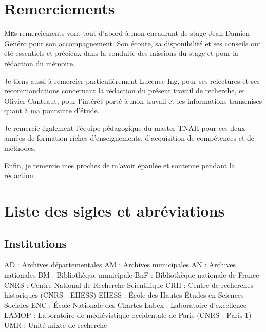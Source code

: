 \documentclass[a4paper,12pt,twoside]{book}
\begin{document}
		\newpage{\pagestyle{empty}\cleardoublepage}
	
	\chapter{Remerciements}
	
	\lettrine{M}es remerciements vont tout d'abord à mon encadrant de stage Jean-Damien Généro pour son accompagnement. Son écoute, sa disponibilité et ses conseils ont été essentiels et précieux dans la conduite des missions du stage et pour la rédaction du mémoire. 
    \newline 
    \par Je tiens aussi à remercier particulièrement Lucence Ing, pour ses relectures et ses recommandations concernant la rédaction du présent travail de recherche, et Olivier Canteaut, pour l'intérêt porté à mon travail et les informations transmises quant à ma poursuite d'étude.
    \newline 
    \par Je remercie également l'équipe pédagogique du master TNAH pour ces deux années de formation riches d'enseignements, d'acquisition de compétences et de méthodes. 
    \newline 
    \par Enfin, je remercie mes proches de m'avoir épaulée et soutenue pendant la rédaction. 

    \newpage{\pagestyle{empty}\cleardoublepage}
	
	\chapter{Liste des sigles et abréviations}

    \section*{Institutions}

    \noindent AD : Archives départementales
    \newline 
    AM : Archives municipales
    \newline 
    AN : Archives nationales
    \newline 
    BM : Bibliothèque municipale
    \newline 
    BnF : Bibliothèque nationale de France
    \newline 
    CNRS : Centre National de Recherche Scientifique
    \newline 
    CRH : Centre de recherches historiques (CNRS - EHESS)
    \newline 
    EHESS : École des Hautes Études en Sciences Sociales
    \newline 
    ENC : École Nationale des Chartes
    \newline 
    Labex : Laboratoire d'excellence
    \newline
    LAMOP : Laboratoire de médiévistique occidentale de Paris (CNRS - Paris 1)
    \newline
    UMR : Unité mixte de recherche
\end{document}
